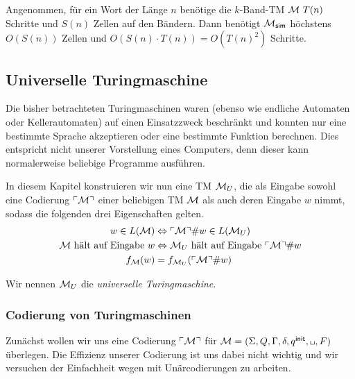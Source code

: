 \begin{Bemerkung}
	Angenommen, für ein Wort der Länge $n$ benötige die $k$-Band-\ac{TM} $\mathcal{M}\ T(n)$ Schritte und $S(n)$ Zellen auf den Bändern.
	Dann benötigt $\mathcal{M}_\mathsf{sim}$ höchstens $O(S(n))$ Zellen und $O(S(n)\cdot T(n))=O(T(n)^2)$ Schritte.
\end{Bemerkung}





\subsection{Universelle Turingmaschine}
Die bisher betrachteten Turingmaschinen waren (ebenso wie endliche Automaten oder Kellerautomaten) 
auf einen Einsatzzweck beschränkt und konnten nur eine bestimmte Sprache akzeptieren oder eine bestimmte Funktion berechnen.
Dies entspricht nicht unserer Vorstellung eines Computers, denn dieser kann normalerweise beliebige Programme ausführen.

In diesem Kapitel konstruieren wir nun eine \ac{TM} $\mathcal{M}_U$, die als Eingabe sowohl
eine Codierung $\ulcorner \mathcal{M} \urcorner$ einer beliebigen \ac{TM} $\mathcal{M}$ als auch deren Eingabe $w$ nimmt, sodass die folgenden drei Eigenschaften gelten.
\begin{align}
	\label{Mu-eq-lang} w\in L(\mathcal{M}) &\Leftrightarrow \ulcorner \mathcal{M} \urcorner\#w \in L(\mathcal{M}_U)\\
	\label{Mu-eq-term} \text{$\mathcal{M}$ hält auf Eingabe $w$} &\Leftrightarrow \text{$\mathcal{M}_U$ hält auf Eingabe $\ulcorner \mathcal{M} \urcorner\#w$}\\
	\label{Mu-eq-func} \text{$f_{\mathcal{M}}(w)$} &= \text{$f_{\mathcal{M}_U}(\ulcorner \mathcal{M} \urcorner\#w)$}
\end{align}

Wir nennen $\mathcal{M}_U$ die \emph{universelle Turingmaschine}.

\subsubsection{Codierung von Turingmaschinen}\label{subsec:codeTuring}

Zunächst wollen wir uns eine Codierung $\ulcorner \mathcal{M} \urcorner$ für $\M=(\Sigma, Q, \Gamma, \delta, \qinit, \blank, F)$ überlegen.
Die Effizienz unserer Codierung ist uns dabei nicht wichtig und wir versuchen der Einfachheit wegen mit Unärcodierungen zu arbeiten.

